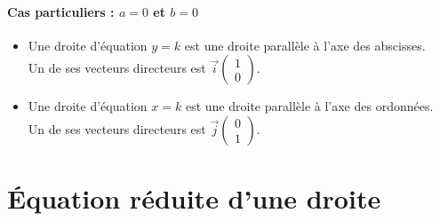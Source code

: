 \paragraph{Cas particuliers : $a=0$ et $b=0$}
\begin{itemize}[label=\textcolor{Couleur8}{$\bullet$}]
\item Une droite d'équation $y=k$ est une droite parallèle à l'axe des abscisses. \\Un de ses vecteurs directeurs est $\overrightarrow{i}\begin{pmatrix}
1\\
0
\end{pmatrix}$.
\item  Une droite d'équation $x=k$ est une droite parallèle à l'axe des ordonnées. \\Un de ses vecteurs directeurs est $\overrightarrow{j}\begin{pmatrix}
0\\
1
\end{pmatrix}$.
\end{itemize}



\section{Équation réduite d'une droite}

